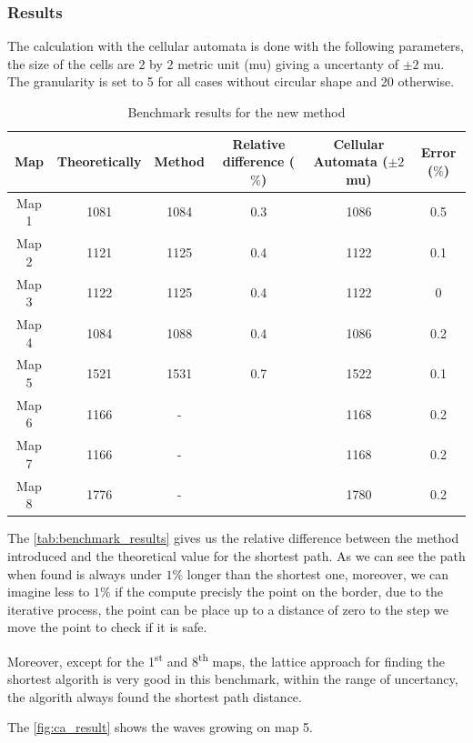 \documentclass[../main.tex]{subfiles}
\begin{document}
\subsubsection{Results}

The calculation with the cellular automata is done with the following parameters, the size of the cells are 2 by 2 metric unit (mu) giving a uncertanty of $\pm 2$ mu. The granularity is set to 5 for all cases without circular shape and 20 otherwise.

\begin{table}[H]
	\centering
	\begin{tabular}{c c c c c c}
		\hline
		Map & Theoretically & Method & Relative difference ($\%$) & Cellular Automata ($\pm 2$ mu) & Error ($\%$)\\
		\hline
		Map 1 & 1081 & 1084 & 0.3 & 1086 & 0.5\\
		Map 2 & 1121 & 1125 & 0.4 & 1122 & 0.1\\
		Map 3 & 1122 & 1125 & 0.4 & 1122 & 0\\
		Map 4 & 1084 & 1088 & 0.4 & 1086 & 0.2\\
		Map 5 & 1521 & 1531 & 0.7 & 1522 & 0.1\\
		Map 6 & 1166 & - &  & 1168 & 0.2\\
		Map 7 & 1166 & - &  & 1168 & 0.2\\
		Map 8 & 1776 & - &  & 1780 & 0.2\\
		\hline
	\end{tabular}
	\caption{Benchmark results for the new method}
	\label{tab:benchmark_results}
\end{table}

The \autoref{tab:benchmark_results} gives us the relative difference between the method introduced and the theoretical value for the shortest path. As we can see the path when found is always under $1\%$ longer than the shortest one, moreover, we can imagine less to $1\%$ if the compute precisly the point on the border, due to the iterative process, the point can be place up to a distance of zero to the step we move the point to check if it is safe.

\vspace{1em}
Moreover, except for the 1\textsuperscript{st} and 8\textsuperscript{th} maps, the lattice approach for finding the shortest algorith is very good in this benchmark, within the range of uncertancy, the algorith always found the shortest path distance.

\vspace{1em}
The \autoref{fig:ca_result} shows the waves growing on map 5.
\end{document}
